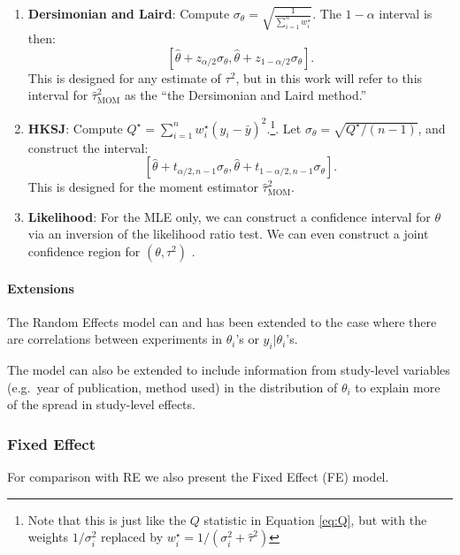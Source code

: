 \documentclass[letterpaper,12pt]{article}
\begin{document}
\begin{enumerate}
  \item \textbf{Dersimonian and Laird}: Compute $\sigma_\theta=\sqrt{\frac{1}{\sum_{i=1}^nw_i^\star}}$. The $1-\alpha$ interval is then:
  \begin{equation}
    \left[\hat\theta+z_{\alpha/2}\sigma_\theta,\hat\theta+z_{1-\alpha/2}\sigma_\theta\right].
  \end{equation}
  This is designed for any estimate of $\tau^2$, but in this work will refer to this interval for $\hat\tau^2_{\mathrm{MOM}}$ as the ``the Dersimonian and Laird method.''
  \item \textbf{HKSJ}: Compute $Q^\star=\sum_{i=1}^n w_i^\star(y_i-\bar{y})^2$.\footnote{Note that this is just like the $Q$ statistic in Equation \ref{eq:Q}, but with the weights $1/\sigma_i^2$ replaced by $w_i^\star=1/(\sigma_i^2+\hat\tau^2)$}. Let $\sigma_\theta=\sqrt{Q^\star/(n-1)}$, and construct the interval:
  \begin{equation}
    \left[\hat\theta+t_{\alpha/2,n-1}\sigma_\theta,\hat\theta+t_{1-\alpha/2,n-1}\sigma_\theta\right].
  \end{equation}
  This is designed for the moment estimator $\hat\tau^2_{\mathrm{MOM}}$.
  \item \textbf{Likelihood}: For the MLE only, we can construct a confidence interval for $\theta$ via an inversion of the likelihood ratio test. We can even construct a joint confidence region for $(\theta,\tau^2)$ \citep{hardy1996likelihood}.
\end{enumerate}

\paragraph{Extensions}\label{extensions}

The Random Effects model can and has been extended to the case where there are correlations between experiments in $\theta_i$'s or $y_i|\theta_i$'s.

The model can also be extended to include information from study-level variables (e.g.~year of publication, method used) in the distribution of $\theta_i$ to explain more of the spread in study-level effects.

\subsubsection{Fixed Effect}\label{sec:fixed-effect}

For comparison with RE we also present the Fixed Effect (FE) model.
\end{document}

